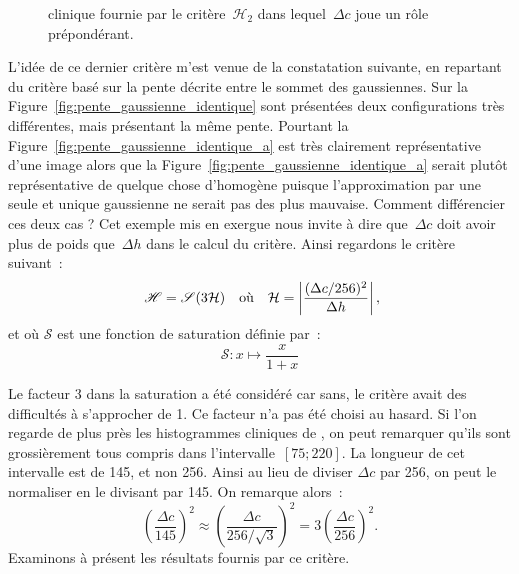 \documentclass[main.tex]{subfiles}
\begin{document}
\begin{figure}[h]
\centering
{}
\caption{\label{fig:critere_dc2_sur_dh}\Hetero clinique fournie par le critère~$\mathcal{H}_{2}$ dans lequel~$\Delta c$ joue un rôle prépondérant.}
\end{figure}
L'idée de ce dernier critère m'est venue de la constatation suivante, en repartant du critère  %
basé sur la pente décrite entre le sommet des gaussiennes. Sur la Figure~\ref{fig:pente_gaussienne_identique} sont présentées deux configurations très différentes, mais présentant la même pente. Pourtant la Figure~\ref{fig:pente_gaussienne_identique_a} est très clairement représentative d'une image \heterogene alors que la Figure~\ref{fig:pente_gaussienne_identique_a} serait plutôt représentative de quelque chose  d'homogène puisque l'approximation par une seule et unique gaussienne ne serait pas des plus mauvaise. 
Comment différencier ces deux cas ? Cet exemple mis en exergue nous invite à dire que~$\Delta c$ doit avoir plus de poids que~$\Delta h$ dans le calcul du critère\HH. %
Ainsi regardons le critère suivant~:
\begin{equation}\label{eq:def_bon_critere}
~\mathscr{H} = \mathscr{S}(3\mathcal{H}) \quad \textrm{où} \quad \mathcal{H}=\left| \dfrac{(\Delta c /256)^2}{\Delta h} \right|,
\end{equation}
et où $\mathscr{S}$ est une fonction de saturation définie par~:
\begin{equation}
\mathscr{S} : x \mapsto \dfrac{x}{1+x}
\end{equation}

Le facteur 3 dans la saturation a été considéré car sans, le critère avait des difficultés à s'approcher de 1. Ce facteur n'a pas été choisi au hasard. %
Si l'on regarde de plus près les histogrammes cliniques de \Nber, on peut remarquer qu'ils sont grossièrement tous compris dans l'intervalle~$[75;220]$. La longueur de cet intervalle est de 145, et non 256. Ainsi au lieu de diviser $\Delta c$ par 256, on peut le normaliser en le divisant par 145. On remarque alors~:
\begin{equation}
\left(\frac{\Delta c}{145}\right)^2 \approx \left(\frac{\Delta c}{256/\sqrt{3}}\right)^2 =  3 \left(\frac{\Delta c}{256}\right)^2.
\end{equation}
Examinons à présent les résultats fournis par ce critère.
\end{document}
